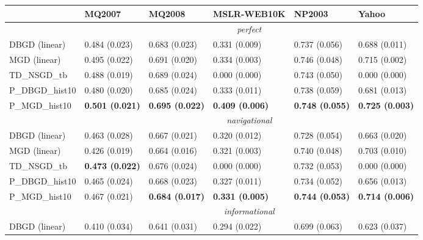 \begin{tabular*}{\textwidth}{@{\extracolsep{\fill} } l  l l l l l  }
\toprule
 & { \small \textbf{MQ2007}}  & { \small \textbf{MQ2008}}  & { \small \textbf{MSLR-WEB10K}}  & { \small \textbf{NP2003}}  & { \small \textbf{Yahoo}} \\
\midrule
& \multicolumn{5}{|c|}{\textit{perfect}} \\
\midrule
DBGD (linear) & 0.484 {\tiny (0.023)} & 0.683 {\tiny (0.023)} & 0.331 {\tiny (0.009)} & 0.737 {\tiny (0.056)} & 0.688 {\tiny (0.011)} \\
MGD (linear) & 0.495 {\tiny (0.022)} & 0.691 {\tiny (0.020)} & 0.334 {\tiny (0.003)} & 0.746 {\tiny (0.048)} & 0.715 {\tiny (0.002)} \\
TD\_NSGD\_tb & 0.488 {\tiny (0.019)} & 0.689 {\tiny (0.024)} & 0.000 {\tiny (0.000)} & 0.743 {\tiny (0.050)} & 0.000 {\tiny (0.000)} \\
P\_DBGD\_hist10 & 0.480 {\tiny (0.020)} & 0.685 {\tiny (0.024)} & 0.333 {\tiny (0.011)} & 0.738 {\tiny (0.059)} & 0.681 {\tiny (0.013)} \\
P\_MGD\_hist10 & \bf 0.501 {\tiny (0.021)} & \bf 0.695 {\tiny (0.022)} & \bf 0.409 {\tiny (0.006)} & \bf 0.748 {\tiny (0.055)} & \bf 0.725 {\tiny (0.003)} \\
\midrule
& \multicolumn{5}{|c|}{\textit{navigational}} \\
\midrule
DBGD (linear) & 0.463 {\tiny (0.028)} & 0.667 {\tiny (0.021)} & 0.320 {\tiny (0.012)} & 0.728 {\tiny (0.054)} & 0.663 {\tiny (0.020)} \\
MGD (linear) & 0.426 {\tiny (0.019)} & 0.664 {\tiny (0.016)} & 0.321 {\tiny (0.003)} & 0.740 {\tiny (0.048)} & 0.703 {\tiny (0.010)} \\
TD\_NSGD\_tb & \bf 0.473 {\tiny (0.022)} & 0.676 {\tiny (0.024)} & 0.000 {\tiny (0.000)} & 0.732 {\tiny (0.053)} & 0.000 {\tiny (0.000)} \\
P\_DBGD\_hist10 & 0.465 {\tiny (0.024)} & 0.668 {\tiny (0.023)} & 0.327 {\tiny (0.011)} & 0.734 {\tiny (0.052)} & 0.656 {\tiny (0.013)} \\
P\_MGD\_hist10 & 0.467 {\tiny (0.021)} & \bf 0.684 {\tiny (0.017)} & \bf 0.331 {\tiny (0.005)} & \bf 0.744 {\tiny (0.053)} & \bf 0.714 {\tiny (0.006)} \\
\midrule
& \multicolumn{5}{|c|}{\textit{informational}} \\
\midrule
DBGD (linear) & 0.410 {\tiny (0.034)} & 0.641 {\tiny (0.031)} & 0.294 {\tiny (0.022)} & 0.699 {\tiny (0.063)} & 0.623 {\tiny (0.037)} \\

\end{tabular*}

